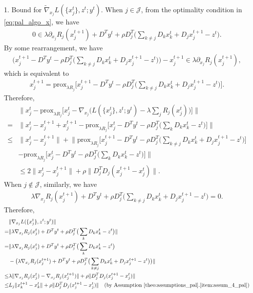 1. Bound for $\tilde{\nabla}_{x_j} L(\{x^t_j\}, z^t; y^t)$. When $j\in\mathcal{J}$, from the optimality condition in \eqref{eq:pal_algo_x}, we have 
\begin{align}
    0 \in \lambda\partial_{x_j}R_j(x_j^{t+1}) + D^Ty^t + \rho D_j^T\big(\sum_{k\not=j} D_kx_k^{t} + D_jx_j^{t+1} - z^{t}\big).\nonumber
\end{align}
By some rearrangement, we have
\begin{align}
    \big(x_j^{t+1} - D^Ty^t - \rho D_j^T\big(\sum_{k\not=j} D_kx_k^{t}+ D_jx_j^{t+1} - z^{t}\big)\big) - x_j^{t+1} \in \lambda\partial_{x_j}R_j(x_j^{t+1}),\nonumber
\end{align}
which is equivalent to 
\begin{align}
    x_j^{t+1} = \text{prox}_{\lambda R_j}\big[x_j^{t+1} - D^Ty^t - \rho D_j^T\big(\sum_{k\not=j} D_kx_k^{t}+ D_jx_j^{t+1} - z^{t}\big)\big]. 
\end{align}
Therefore,
\begin{align}
    & \|x_j^t - \text{prox}_{\lambda R_j} \big[x_j^t-\nabla_{x_j}\big(L(\{x^t_j\}, z^t; y^t) - \lambda\sum_j R_j(x_j^t)\big)\big]\|\nonumber\\
    = & \big\|x_j^t - x_j^{t+1} + x_j^{t+1} - \text{prox}_{\lambda R_j}\big[x_j^{t} - D^Ty^t - \rho D_j^T\big(\sum_{k} D_kx_k^{t} - z^{t}\big)\big]\big\|\nonumber\\
    \le & \|x_j^t - x_j^{t+1}\| + \big\|  \text{prox}_{\lambda R_j}\big[x_j^{t+1} - D^Ty^t - \rho D_j^T\big( \sum_{k\not=j} D_kx_k^{t}+ D_jx_j^{t+1} - z^{t}\big)\big]\nonumber\\
    &  - \text{prox}_{\lambda R_j}\big[x_j^{t} - D^Ty^t - \rho D_j^T\big(\sum_{k} D_kx_k^{t} - z^{t}\big)\big]\big\|\nonumber\\
    & \le 2\|x_j^t - x_j^{t+1}\| + \rho\|D_j^TD_j(x_j^{t+1} - x_j^t)\|. \label{eq:proof_pal_bound_V_1}
\end{align}
When $j\not\in\mathcal{J}$, similarly, we have
\begin{align}
    \lambda\nabla_{x_j}R_j(x_j^{t+1}) + D^Ty^t + \rho D_j^T\big(\sum_{k\not=j} D_kx_k^{t}+ D_jx_j^{t+1} - z^{t}\big) = 0.
\end{align}
Therefore,
\begin{align}
    & \|\nabla_{x_j} L(\{x^t_j\}, z^t; y^t)\|\nonumber\\
    = & \|\lambda\nabla_{x_j}R_j(x_j^{t}) + D^Ty^t + \rho D_j^T\big( \sum_{k} D_kx_k^{t} - z^{t}\big)\|\nonumber\\
    = &  \|\lambda\nabla_{x_j}R_j(x_j^{t}) + D^Ty^t + \rho D_j^T\big( \sum_{k} D_kx_k^{t} - z^{t}\big)\nonumber\\
     & - \big(\lambda\nabla_{x_j}R_j(x_j^{t+1}) + D^Ty^t + \rho D_j^T\big(\sum_{k\not=j} D_kx_k^{t}+ D_jx_j^{t+1} - z^{t}\big)\big)\|\nonumber\\
    \le &  \lambda\|\nabla_{x_j}R_j(x_j^{t}) - \nabla_{x_j}R_j(x_j^{t+1}) \| + \rho\|D_j^TD_j(x_j^{t+1} - x_j^t)\|\nonumber\\
    \le & L_j\| x_k^{t+1} - x_k^t \|  + \rho\|D_j^TD_j(x_j^{t+1} - x_j^t)\| \quad\text{(by Assumption~\ref{theo:assumptions_pal}.\ref{item:assum_4_pal})}\label{eq:proof_pal_bound_V_2}
\end{align}

